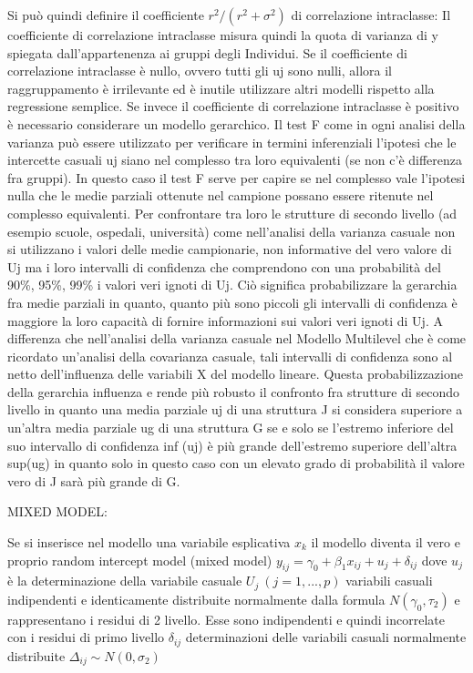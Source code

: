 \documentclass[a4page, 11pt]{article}
\begin{document}
\newline
Si può quindi definire il coefficiente $r^{2} / (r^{2}+\sigma^{2})$  di  correlazione intraclasse: 
\newline
Il coefficiente di correlazione intraclasse misura quindi la quota di varianza di y spiegata dall’appartenenza ai gruppi degli Individui. Se il coefficiente di correlazione intraclasse è nullo, ovvero tutti gli uj sono nulli, allora il raggruppamento è irrilevante ed è inutile utilizzare altri modelli rispetto alla regressione semplice. Se invece il coefficiente di correlazione intraclasse è positivo è necessario considerare un modello gerarchico.
\newline
Il test F come in ogni analisi della varianza può essere utilizzato per verificare in termini inferenziali l’ipotesi che le intercette casuali uj siano nel complesso tra loro equivalenti (se non c’è differenza fra gruppi). In questo caso il test F serve per capire se nel complesso vale l’ipotesi nulla che le medie parziali ottenute nel campione possano essere ritenute nel complesso equivalenti. Per confrontare tra loro le strutture di secondo livello (ad esempio scuole, ospedali, università) come nell’analisi della varianza casuale non si utilizzano i valori delle medie campionarie, non informative del vero valore di Uj ma i loro intervalli di confidenza che comprendono con una probabilità del 90\%, 95\%, 99\% i valori veri ignoti di Uj.
\newline
Ciò significa probabilizzare la gerarchia fra medie parziali in quanto, quanto più sono piccoli gli intervalli di confidenza è maggiore la loro capacità di fornire informazioni sui valori veri ignoti di Uj. A differenza che nell’analisi della varianza casuale nel Modello Multilevel che è come ricordato un’analisi della covarianza casuale, tali intervalli di confidenza sono al netto dell’influenza delle variabili X del modello lineare. Questa probabilizzazione della gerarchia influenza e rende più robusto il confronto fra strutture di secondo livello in quanto una media parziale uj di una struttura J si considera superiore a un’altra media parziale ug di una struttura G se e solo se l’estremo inferiore del suo intervallo di confidenza inf (uj) è più grande dell’estremo superiore dell’altra sup(ug) in quanto solo in questo caso con un elevato grado di probabilità il valore vero di J sarà più grande di G.

MIXED MODEL: %

Se si inserisce nel modello una variabile esplicativa $x_k$ il modello diventa il vero e proprio random intercept model (mixed model) $y_{ij}=\gamma_0+\beta_1 x_{ij}+ u_j + \delta_{ij}$ dove $u_j$ è la determinazione della variabile casuale $U_j \ (j=1,...,p)$ variabili casuali indipendenti e identicamente distribuite normalmente dalla formula $N(\gamma_0, \tau_2)$ e rappresentano i residui di 2 livello. Esse sono indipendenti e quindi incorrelate con i residui di primo livello $\delta_{ij}$ determinazioni delle variabili casuali normalmente distribuite $\Delta_{ij} \sim N(0,\sigma_2)$
\end{document}
